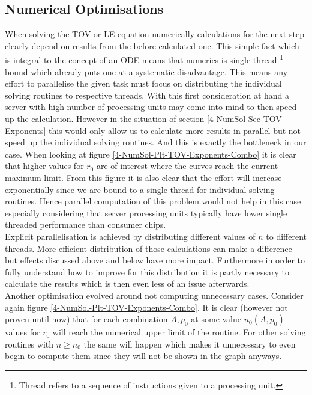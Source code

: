 \begin{appendix}
\begin{section}
\subsection{Numerical Optimisations}
\label{99-App-Numerical-Optimisations}
When solving the \ac{TOV} or \ac{LE} equation numerically calculations for the next step clearly depend on results from the before calculated one.
This simple fact which is integral to the concept of an \ac{ODE} means that numerics is single thread \footnote{Thread refers to a sequence of instructions given to a processing unit.} bound which already puts one at a systematic disadvantage.
This means any effort to parallelise the given task must focus on distributing the individual solving routines to respective threads.
With this first consideration at hand a server with high number of processing units may come into mind to then speed up the calculation.
However in the situation of section \ref{4-NumSol-Sec-TOV-Exponents} this would only allow us to calculate more results in parallel but not speed up the individual solving routines.
And this is exactly the bottleneck in our case.
When looking at figure \ref{4-NumSol-Plt-TOV-Exponents-Combo} it is clear that higher values for $r_0$ are of interest where the curves reach the current maximum limit.
From this figure it is also clear that the effort will increase exponentially since we are bound to a single thread for individual solving routines.
Hence parallel computation of this problem would not help in this case especially considering that server processing units typically have lower single threaded performance than consumer chips.\\
Explicit parallelisation is achieved by distributing different values of $n$ to different threads. 
More efficient distribution of those calculations can make a difference but effects discussed above and below have more impact.
Furthermore in order to fully understand how to improve for this distribution it is partly necessary to calculate the results which is then even less of an issue afterwards.\\
Another optimisation evolved around not computing unnecessary cases.
Consider again figure \ref{4-NumSol-Plt-TOV-Exponents-Combo}.
It is clear (however not proven until now) that for each combination $A,p_0$ at some value $n_0(A,p_0)$ values for $r_0$ will reach the numerical upper limit of the routine.
For other solving routines with $n\geq n_0$ the same will happen which makes it unnecessary to even begin to compute them since they will not be shown in the graph anyways.

\end{section}
\end{appendix}
